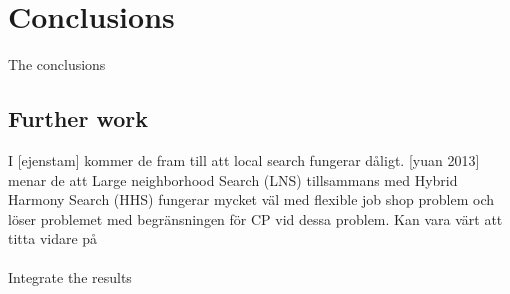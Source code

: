 \chapter{Conclusions} 
The conclusions

\section{Further work}
I [ejenstam] kommer de fram till att local search fungerar dåligt.\cite{ejenstam_2014} [yuan 2013] menar de att Large neighborhood Search (LNS) tillsammans med Hybrid Harmony Search (HHS) fungerar mycket väl med flexible job shop problem och löser problemet med begränsningen för CP vid dessa problem.\cite{yuan_2013} Kan vara värt att titta vidare på
\\\\
\cite{Bjordal} Integrate the results